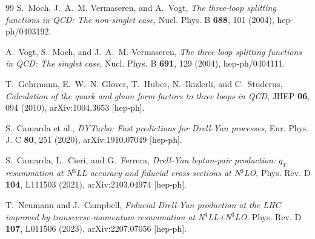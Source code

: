 \documentclass[aps,prd,preprint,superscriptaddress,nofootinbib,longbibliography]{revtex4-2}
\begin{document}
\begin{thebibliography}{99}
S.~Moch, J.~A.~M. Vermaseren, and A.~Vogt,
\textit{The three-loop splitting functions in QCD: The non-singlet case},
Nucl. Phys. B \textbf{688}, 101 (2004),
hep-ph/0403192.

A.~Vogt, S.~Moch, and J.~A.~M. Vermaseren,
\textit{The three-loop splitting functions in QCD: The singlet case},
Nucl. Phys. B \textbf{691}, 129 (2004),
hep-ph/0404111.

T.~Gehrmann, E.~W.~N. Glover, T.~Huber, N.~Ikizlerli, and C.~Studerus,
\textit{Calculation of the quark and gluon form factors to three loops in QCD},
JHEP \textbf{06}, 094 (2010),
arXiv:1004.3653 [hep-ph].

S.~Camarda et al.,
\textit{DYTurbo: Fast predictions for Drell-Yan processes},
Eur. Phys. J. C \textbf{80}, 251 (2020),
arXiv:1910.07049 [hep-ph].

S.~Camarda, L.~Cieri, and G.~Ferrera,
\textit{Drell-Yan lepton-pair production: $q_T$ resummation at N$^3$LL accuracy and fiducial cross sections at N$^3$LO},
Phys. Rev. D \textbf{104}, L111503 (2021),
arXiv:2103.04974 [hep-ph].

T.~Neumann and J.~Campbell,
\textit{Fiducial Drell-Yan production at the LHC improved by transverse-momentum resummation at N$^4$LL+N$^3$LO},
Phys. Rev. D \textbf{107}, L011506 (2023),
arXiv:2207.07056 [hep-ph].

\end{thebibliography}
\end{document}
